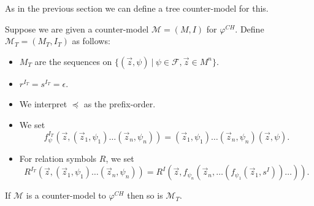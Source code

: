 \documentclass[runningheads]{llncs}
\begin{document}
As in the previous section we can define a tree counter-model for this.
\begin{definition}
	Suppose we are given a counter-model $\mathcal M = (M, I)$ for $\varphi^{CH}$. Define $\mathcal M_T = (M_T, I_T)$ as follows:
	\begin{itemize}
		\item $M_T$ are the sequences on $\{(\vec z, \psi)\:|\:\psi\in \mathcal F, \vec z\in M^n\}$.
		\item $r^{I_T} = s^{I_T} = \epsilon$.
		\item We interpret $\preceq$ as the prefix-order.
		\item We set $$f_\psi^{I_T}(\vec z, (\vec z_1, \psi_1)\dots (\vec z_n, \psi_n)) = (\vec z_1, \psi_1)\dots (\vec z_n, \psi_n)(\vec z, \psi).$$
		\item For relation symbols $R$, we set $${R}^{I_T}(\vec z, (\vec z_1, \psi_1)\dots (\vec z_n, \psi_n)) = {R}^I(\vec z, f_{\psi_n}(\vec z_n, \dots(f_{\psi_1}(\vec z_1, s^I))\dots)).$$
	\end{itemize}
\end{definition}

\begin{lemma}
	If $\mathcal M$ is a counter-model to $\varphi^{CH}$ then so is $\mathcal M_T$.
\end{lemma}
\end{document}
